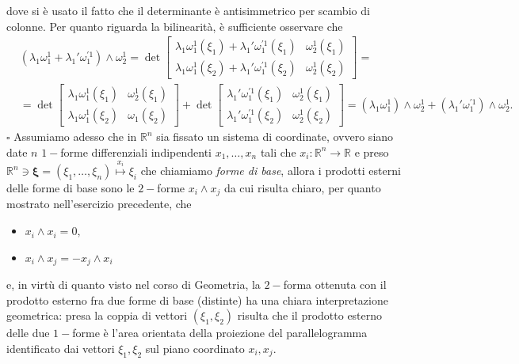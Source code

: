     dove si è usato il fatto che il determinante è antisimmetrico per scambio di colonne.
    Per quanto riguarda la bilinearità, è sufficiente osservare che
    \[\begin{aligned}
        &(\lambda_1 \omega_1^1 + \lambda_1' \omega_1^{'1}) \wedge \omega_2^1 = \det{\begin{bmatrix}
            \lambda_1 \omega_1^1(\xi_1) + \lambda_1' \omega_1^{'1}(\xi_1) & \omega_2^1(\xi_1) \\
            \lambda_1 \omega_1^1(\xi_2) + \lambda_1' \omega_1^{'1}(\xi_2) & \omega_2^1(\xi_2)
        \end{bmatrix}} = \\
        &=\det{\begin{bmatrix}
            \lambda_1 \omega_1^1(\xi_1) & \omega_2^1(\xi_1) \\
            \lambda_1 \omega_1^1(\xi_2) & \omega_1(\xi_2)
        \end{bmatrix}} + \det{\begin{bmatrix}
            \lambda_1' \omega_1^{'1}(\xi_1) & \omega_2^1(\xi_1) \\
            \lambda_1' \omega_1^{'1}(\xi_2) & \omega_2^1(\xi_2)
        \end{bmatrix}} = (\lambda_1 \omega_1^1) \wedge \omega_2^1 + (\lambda_1' \omega_1^{'1}) \wedge \omega_2^1.
    \end{aligned}\]
\hfill $\square$
%
Assumiamo adesso che in $\mathbb{R}^n$ sia fissato un sistema di coordinate, ovvero siano date $n$ $1-$forme differenziali indipendenti $x_1, \ldots, x_n$ tali che $x_i: \mathbb{R}^n \to \mathbb{R}$ e preso $\mathbb{R}^n \ni \mathbf{\xi} = (\xi_1, \ldots, \xi_n) \stackrel{x_i}{\mapsto} \xi_i$ che chiamiamo \emph{forme di base}, allora i prodotti esterni delle forme di base sono le $2-$forme $x_i \wedge x_j$ da cui risulta chiaro, per quanto mostrato nell'esercizio precedente, che
%
\begin{itemize}
    \item $x_i \wedge x_i = 0$,
    \item $x_i \wedge x_j = - x_j \wedge x_i$
\end{itemize}
%
e, in virtù di quanto visto nel corso di Geometria, la $2-$forma ottenuta con il prodotto esterno fra due forme di base (distinte) ha una chiara interpretazione geometrica: presa la coppia di vettori $(\xi_1, \xi_2)$ risulta che il prodotto esterno delle due $1-$forme è l'area orientata della proiezione del parallelogramma identificato dai vettori $\xi_1, \xi_2$ sul piano coordinato $x_i, x_j$.
